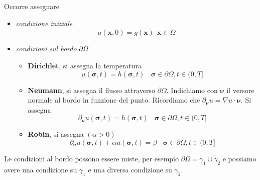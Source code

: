 \documentclass[10pt,a4paper,twoside,openright]{book}
\newcommand{\x}{\mathbf{x}}
\newcommand{\sigg}{\bm{\sigma}}
\newcommand{\nuu}{\bm{\nu}}
\begin{document}
Occorre assegnare
\begin{itemize}
    \item \textit{condizione iniziale}
          \begin{equation*}
              u(\x,0) =g(\x) \ \ \x \in \overline{\Omega }
          \end{equation*}
    \item \textit{condizioni sul bordo} $\partial \Omega $
          \begin{itemize}
              \item \textbf{Dirichlet}, si assegna la temperatura
                    \begin{equation*}
                        u(\sigg,t) =h(\sigg,t) \ \ \ \ \sigg \in \partial \Omega,t\in (0,T]
                    \end{equation*}
              \item \textbf{Neumann}, si assegna il flusso attraverso $\partial \Omega $. Indichiamo con $\nuu$ il versore normale al bordo in funzione del punto. Ricordiamo che $\partial _{\nuu} u=\nabla u\cdotp \nuu$. Si assegna
                    \begin{equation}
                        \partial _{\nuu}u(\sigg,t) =h(\sigg,t) \ \ \ \ \sigg \in \partial \Omega,t\in (0,T]
                    \end{equation}
              \item \textbf{Robin}, si assegna $(\alpha  >0)$
                    \begin{equation*}
                        \partial _{\nuu} u(\sigg,t) +\alpha u(\sigg,t) =\beta \ \ \ \ \sigg \in \partial \Omega,t\in (0,T]
                    \end{equation*}
          \end{itemize}
\end{itemize}

Le condizioni al bordo possono essere miste, per esempio $\partial \Omega =\gamma _{1} \cup \gamma _{2}$ e possiamo avere una condizione su $\gamma _{1}$ e una diversa condizione su $\gamma _{2}$.
\end{document}
